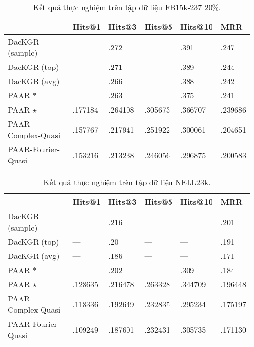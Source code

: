 \begin{center}
    \begin{table}[H]
        \centering
        \caption{Kết quả thực nghiệm trên tập dữ liệu FB15k-237 20\%.}
        \begin{tabular}{llllll}
            \toprule
         & Hits@1 & Hits@3 & Hits@5 & Hits@10 & MRR \\
            \midrule
         DacKGR (sample) & --- &  .272 & --- &  .391&  .247\\
         DacKGR (top) & --- &  .271 & --- & .389 & .244 \\
         DacKGR (avg) & --- & .266 &---  & .388 & .242 \\
         PAAR $\ast$&---  &  .263 & --- &  .375&  .241\\
         PAAR $\star$&  .177184&  .264108 &  .305673&  .366707&  .239686\\
         PAAR-Complex-Quasi &  .157767 &  .217941 &  .251922&  .300061& .204651\\
         PAAR-Fourier-Quasi & .153216 & .213238 & .246056 & .296875 & .200583  \\
         \bottomrule
        \end{tabular}
    \end{table}
\end{center}


\begin{center}
    \begin{table}[H]
        \centering
        \caption{Kết quả thực nghiệm trên tập dữ liệu NELL23k.}
        \begin{tabular}{llllll}
            \toprule
         & Hits@1 & Hits@3 & Hits@5 & Hits@10 & MRR \\
            \midrule
         DacKGR (sample) & --- &  .216 & --- & --- &  .201\\
         DacKGR (top) & --- &  .20 &---  & --- & .191 \\
         DacKGR (avg) & --- & .186 & --- & --- & .171 \\
         PAAR $\ast$& --- &  .202 & --- &  .309 &  .184\\
         PAAR $\star$&.128635&.216478 &.263328&.344709&.196448\\
         PAAR-Complex-Quasi &.118336 &.192649&.232835&.295234&.175197\\
         PAAR-Fourier-Quasi & .109249 & .187601 & .232431 & .305735 & .171130  \\
         \bottomrule
        \end{tabular}
    \end{table}
\end{center}


